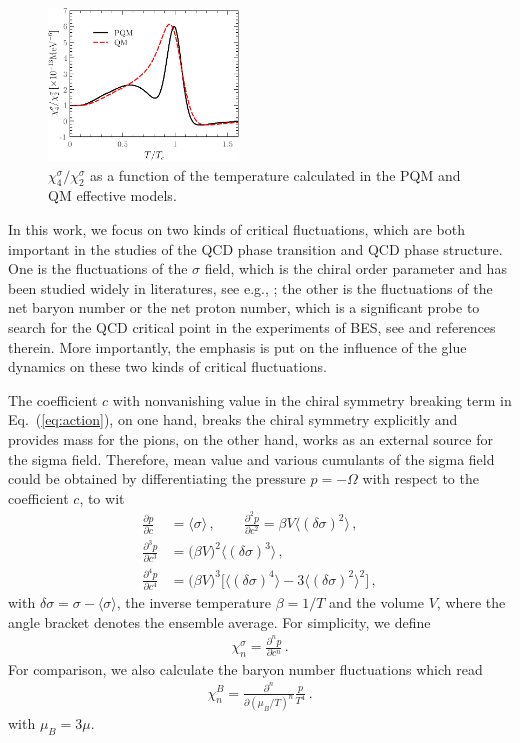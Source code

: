\documentclass[final,5p,times,twocolumn,colorlinks=true,citecolor=blue,linkcolor=blue]{elsarticle}
\def\Eq#1{Eq.~(\ref{#1})}
\begin{document}
%
\begin{figure}[t]
\includegraphics[width=0.45\textwidth]{R42s}
\caption{$\chi_4^{\sigma}/\chi_2^{\sigma}$ as a function of the temperature calculated in the PQM and QM effective models.}\label{fig:R42s}
\end{figure}
%

In this work, we focus on two kinds of critical fluctuations, which are both important in the studies of the QCD phase transition and QCD phase structure. One is the fluctuations of the $\sigma$ field, which is the chiral order parameter and has been studied widely in literatures, see e.g., \cite{Stephanov:1999zu,Stephanov:2008qz,Mukherjee:2015swa}; the other is the fluctuations of the net baryon number or the net proton number, which is a significant probe to search for the QCD critical point in the experiments of BES, see \cite{Luo:2017faz} and references therein. More importantly, the emphasis is put on the influence of the glue dynamics on these two kinds of critical fluctuations.

The coefficient $c$ with nonvanishing value in the chiral symmetry breaking term in \Eq{eq:action}, on one hand, breaks the chiral symmetry explicitly and provides mass for the pions, on the other hand, works as an external source for the sigma field. Therefore, mean value and various cumulants of the sigma field could be obtained by differentiating the pressure $p=-\Omega$ with respect to the coefficient $c$, to wit
\begin{align}
  \frac{\partial p}{\partial c}&=\langle \sigma \rangle\,, \quad\quad  \frac{\partial^2 p}{\partial c^2}=\beta V\langle (\delta\sigma)^2 \rangle\,,\label{eq:chis12}\\[2ex]
  \frac{\partial^3 p}{\partial c^3}&=\Big(\beta V\Big)^2\langle (\delta\sigma)^3 \rangle\,,\\[2ex]
  \frac{\partial^4 p}{\partial c^4}&=\Big(\beta V\Big)^3\Big[\langle (\delta\sigma)^4 \rangle-3\langle (\delta\sigma)^2 \rangle^2\Big]\,,\label{}
\end{align}
with $\delta\sigma=\sigma-\langle \sigma \rangle$, the inverse temperature $\beta=1/T$ and the volume $V$, where the angle bracket denotes the ensemble average. For simplicity, we define
\begin{align}
  \chi_n^{\sigma}=\frac{\partial^n p}{\partial c^n}\,.\label{eq:chis}
\end{align}
For comparison, we also calculate the baryon number fluctuations which read
\begin{align}
  \chi_n^{B}=\frac{\partial^n }{\partial (\mu_B/T)^n}\frac{p}{T^4}\,.\label{eq:chiB}
\end{align}
with $\mu_B=3\mu$.
\end{document}
